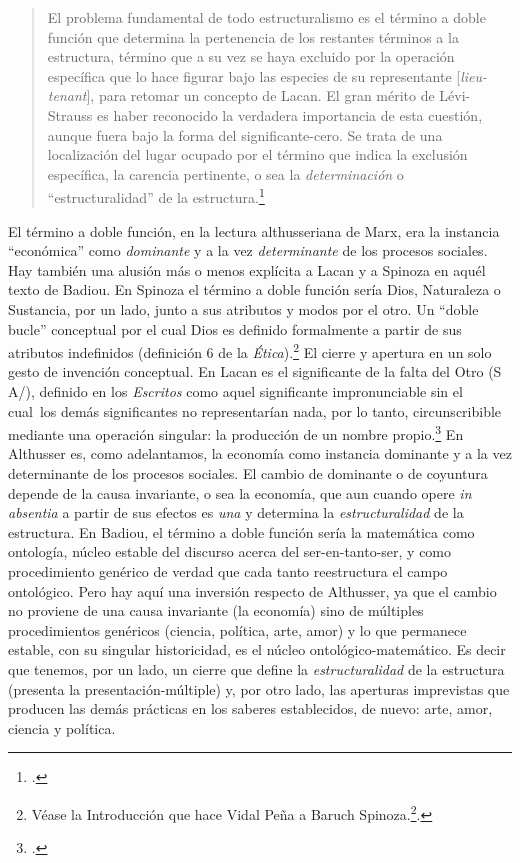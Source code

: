 \begin{quote}
El problema fundamental de todo estructuralismo es el término a doble función que determina la pertenencia de los restantes términos a la estructura, término que a su vez se haya excluido por la operación específica que lo hace figurar bajo las especies de su representante {[}\emph{lieu-tenant}{]}, para retomar un concepto de Lacan. El gran mérito de Lévi-Strauss es haber reconocido la verdadera importancia de esta cuestión, aunque fuera bajo la forma del significante-cero. Se trata de una localización del lugar ocupado por el término que indica la exclusión específica, la carencia pertinente, o sea la \emph{determinación} o \enquote{estructuralidad} de la estructura.\footcite[][285]{@7134-BADIOU1969}
\end{quote}

El término a doble función, en la lectura althusseriana de Marx, era la instancia \enquote{económica} como \emph{dominante} y a la vez \emph{determinante} de los procesos sociales. Hay también una alusión más o menos explícita a Lacan y a Spinoza en aquél texto de Badiou. En Spinoza el término a doble función sería Dios, Naturaleza o Sustancia, por un lado, junto a sus atributos y modos por el otro. Un \enquote{doble bucle} conceptual por el cual Dios es definido formalmente a partir de sus atributos indefinidos (definición 6 de la \emph{Ética}).\footnote{Véase la Introducción que hace Vidal Peña a Baruch Spinoza.\footcite[][31]{@7135-SPINOZA2006}.} El cierre y apertura en un solo gesto de invención conceptual. En Lacan es el significante de la falta del Otro (S A/), definido en los \emph{Escritos} como aquel significante impronunciable sin el cual~los demás significantes no representarían nada, por lo tanto, circunscribible mediante una operación singular: la producción de un nombre propio.\footcite[][799]{@7142-LACAN2002} En Althusser es, como adelantamos, la economía como instancia dominante y a la vez determinante de los procesos sociales. El cambio de dominante o de coyuntura depende de la causa invariante, o sea la economía, que aun cuando opere \emph{in absentia} a partir de sus efectos es \emph{una} y determina la \emph{estructuralidad} de la estructura. En Badiou, el término a doble función sería la matemática como ontología, núcleo estable del discurso acerca del ser-en-tanto-ser, y como procedimiento genérico de verdad que cada tanto reestructura el campo ontológico. Pero hay aquí una inversión respecto de Althusser, ya que el cambio no proviene de una causa invariante (la economía) sino de múltiples procedimientos genéricos (ciencia, política, arte, amor) y lo que permanece estable, con su singular historicidad, es el núcleo ontológico-matemático. Es decir que tenemos, por un lado, un cierre que define la \emph{estructuralidad} de la estructura (presenta la presentación-múltiple) y, por otro lado, las aperturas imprevistas que producen las demás prácticas en los saberes establecidos, de nuevo: arte, amor, ciencia y política.


